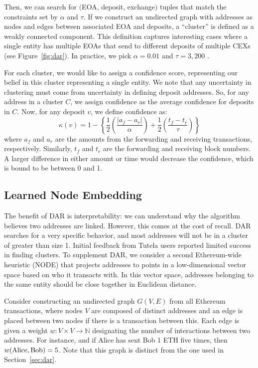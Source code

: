 \documentclass[11pt,a4paper]{article}
\begin{document}
Then, we can search for $($EOA, deposit, exchange$)$ tuples that match the constraints set by $\alpha$ and $\tau$.
If we construct an undirected graph with addresses as nodes and edges between associated EOA and deposits, a ``cluster'' is defined as a weakly connected component. This definition captures interesting cases where a single entity has multiple EOAs that send to different deposits of multiple CEXs (see Figure~\ref{fig:dar}). In practice, we pick $\alpha = 0.01$ and $\tau = 3,200$ \citep{victor2020address}.

For each cluster, we would like to assign a confidence score, representing our belief in this cluster representing a single entity. We note that any uncertainty in clustering must come from uncertainty in defining deposit addresses. So, for any address in a cluster $C$, we assign  confidence as the average confidence for deposits in $C$. Now, for any deposit $v$, we define confidence as:
\begin{equation*}
\kappa(v) = 1 - \left\{ \frac{1}{2}\left(\frac{|a_f - a_r|}{\alpha}\right) + \frac{1}{2}\left(\frac{t_f - t_r}{\tau}\right) \right\}
\end{equation*}
where $a_f$ and $a_r$ are the amounts from the forwarding and receiving transactions, respectively. Similarly, $t_f$ and $t_r$ are the forwarding and receiving block numbers.
A larger difference in either amount or time would decrease the confidence, which is bound to be between 0 and 1.

\subsection{Learned Node Embedding}

The benefit of DAR is interpretability: we can understand why the algorithm believes two addresses are linked. However, this comes at the cost of recall. DAR searches for a very specific behavior, and most addresses will not be in a cluster of greater than size 1. Initial feedback from Tutela users reported limited success in finding clusters.
To supplement DAR, we consider a second Ethereum-wide heuristic (NODE) that projects addresses to points in a low-dimensional vector space based on who it transacts with. In this vector space, addresses belonging to the same entity should be close together in Euclidean distance.

Consider constructing an undirected graph $G(V, E)$ from all Ethereum transactions, where nodes $V$ are composed of distinct addresses and an edge is placed between two nodes if there is a transaction between this. Each edge is given a weight $w: V \times V \rightarrow \mathbb{N}$ designating the number of interactions between two addresses. For instance, and if Alice has sent Bob 1 ETH five times,  then $w(\textup{Alice}, \textup{Bob}) = 5$. Note that this graph is distinct from the one used in Section~\ref{sec:dar}.
\end{document}

